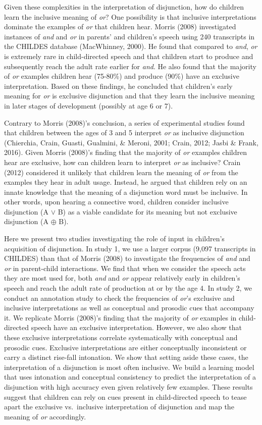 \documentclass[10pt, letterpaper]{article}
\begin{document}
Given these complexities in the interpretation of disjunction, how do
children learn the inclusive meaning of \emph{or}? One possibility is
that inclusive interpretations dominate the examples of \emph{or} that
children hear. Morris (2008) investigated instances of \emph{and} and
\emph{or} in parents' and children's speech using 240 transcripts in the
CHILDES database (MacWhinney, 2000). He found that compared to
\emph{and}, \emph{or} is extremely rare in child-directed speech and
that children start to produce and subsequently reach the adult rate
earlier for \emph{and}. He also found that the majority of \emph{or}
examples children hear (75-80\%) and produce (90\%) have an exclusive
interpretation. Based on these findings, he concluded that children's
early meaning for \emph{or} is exclusive disjunction and that they learn
the inclusive meaning in later stages of development (possibly at age 6
or 7).

Contrary to Morris (2008)'s conclusion, a series of experimental studies
found that children between the ages of 3 and 5 interpret \emph{or} as
inclusive disjunction (Chierchia, Crain, Guasti, Gualmini, \& Meroni,
2001; Crain, 2012; Jasbi \& Frank, 2016). Given Morris (2008)'s finding
that the majority of \emph{or} examples children hear are exclusive, how
can children learn to interpret \emph{or} as inclusive? Crain (2012)
considered it unlikely that children learn the meaning of \emph{or} from
the examples they hear in adult usage. Instead, he argued that children
rely on an innate knowledge that the meaning of a disjunction word must
be inclusive. In other words, upon hearing a connective word, children
consider inclusive disjunction (A \(\vee\) B) as a viable candidate for
its meaning but not exclusive disjunction (A \(\oplus\) B).

Here we present two studies investigating the role of input in
children's acquisition of disjunction. In study 1, we use a larger
corpus (9,097 transcripts in CHILDES) than that of Morris (2008) to
investigate the frequencies of \emph{and} and \emph{or} in parent-child
interactions. We find that when we consider the speech acts they are
most used for, both \emph{and} and \emph{or} appear relatively early in
children's speech and reach the adult rate of production at or by the
age 4. In study 2, we conduct an annotation study to check the
frequencies of \emph{or}'s exclusive and inclusive interpretations as
well as conceptual and prosodic cues that accompany it. We replicate
Morris (2008)'s finding that the majority of \emph{or} examples in
child-directed speech have an exclusive interpretation. However, we also
show that these exclusive interpretations correlate systematically with
conceptual and prosodic cues. Exclusive interpretations are either
conceptually inconsistent or carry a distinct rise-fall intonation. We
show that setting aside these cases, the interpretation of a disjunction
is most often inclusive. We build a learning model that uses intonation
and conceptual consistency to predict the interpretation of a
disjunction with high accuracy even given relatively few examples. These
results suggest that children can rely on cues present in child-directed
speech to tease apart the exclusive vs.~inclusive interpretation of
disjunction and map the meaning of \emph{or} accordingly.
\end{document}
